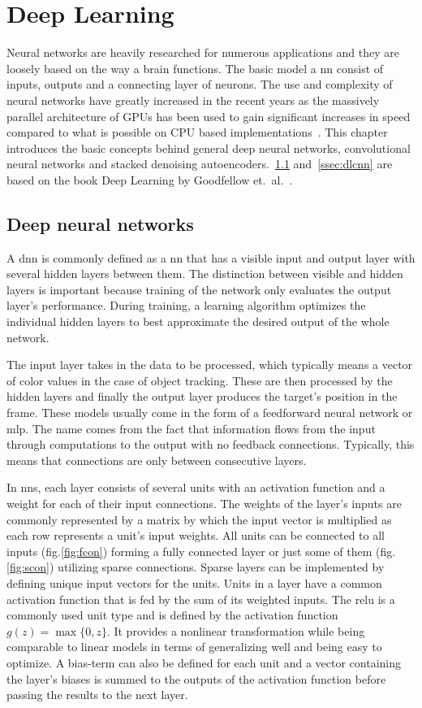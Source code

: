 \section{Deep Learning}
Neural networks are heavily researched for numerous applications and they are loosely
based on the way a brain functions. The basic model a \ac{nn} consist of inputs, outputs
and a connecting layer of neurons. The use and complexity of neural networks have greatly
increased in the recent years as the massively parallel architecture of GPUs has been
used to gain significant increases in speed compared to what is possible on CPU based
implementations~\cite{NIPS_IMAGENET}. This chapter introduces the basic concepts behind
general deep neural networks, convolutional neural networks and stacked denoising
autoencoders.~\ref{ssec:dldnn} and~\ref{ssec:dlcnn} are based on the book Deep Learning
by Goodfellow et.~al.~\cite{DEEP_LEARNING}.

\subsection{Deep neural networks}\label{ssec:dldnn}

A \ac{dnn} is commonly defined as a \ac{nn} that has a visible input and output layer
with several hidden layers between them. The distinction between visible and hidden
layers is important because training of the network only evaluates the output layer's
performance. During training, a learning algorithm optimizes the individual hidden
layers to best approximate the desired output of the whole network.

The input layer takes in the data to be processed, which typically means a vector of
color values in the case of object tracking. These are then processed by the hidden
layers and finally the output layer produces the target's position in the frame. These
models usually come in the form of a feedforward neural network or \ac{mlp}. The name
comes from the fact that information flows from the input through computations to the
output with no feedback connections. Typically, this means that connections are only
between consecutive layers.

In \ac{nn}s, each layer consists of several units with an activation function and a
weight for each of their input connections. The weights of the layer's inputs are
commonly represented by a matrix by which the input vector is multiplied as each row
represents a unit's input weights. All units can be connected to all inputs (fig.\ref{fig:fcon})
forming a fully connected layer or just some of them (fig.\ref{fig:scon}) utilizing
sparse connections. Sparse layers can be implemented by defining unique input vectors
for the units. Units in a layer have a common activation function that is fed by the
sum of its weighted inputs. The \ac{relu} is a commonly used unit type and is defined
by the activation function $g (z) = \max\{0,z\}$. It provides a nonlinear transformation
while being comparable to linear models in terms of generalizing well and being easy to
optimize. A bias-term can also be defined for each unit and a vector containing the layer's
biases is summed to the outputs of the activation function before passing the results to
the next layer.

